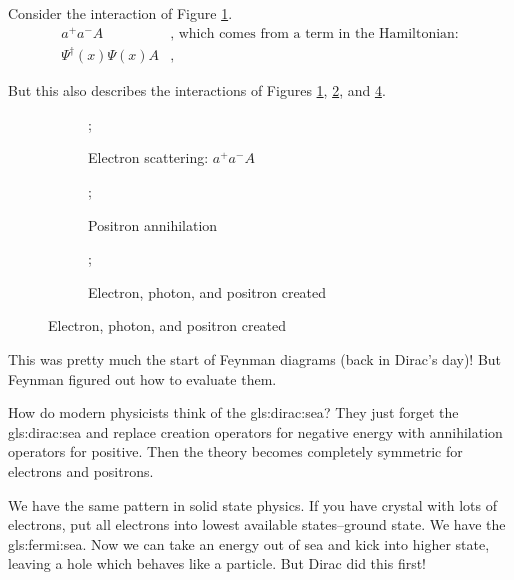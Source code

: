 \documentclass[]{article}
\begin{document}
Consider the interaction of Figure \ref{fig:electron_scattering_dirac}.
\begin{align*}
	a^+a^-A& \text{, which comes from a term in the Hamiltonian:}\\
	\Psi^\dagger(x)\Psi(x)A&\text{, }
\end{align*}

But this also describes the interactions of  Figures \ref{fig:electron_scattering_dirac}, \ref{fig:positron annihilating_dirac}, and \ref{fig:all3-created}.
\begin{figure}[H]
	\caption{Possible outcomes of $\Psi^\dagger(x)\Psi(x)A$: Feynman diagrams.}
	\begin{subfigure}[t]{0.3\textwidth}
		\caption{Electron scattering: $a^+a^-A$}\label{fig:electron_scattering_dirac}
		;
	\end{subfigure}
	\hfill
	\begin{subfigure}[t]{0.3\textwidth}
		\caption{Positron annihilation}\label{fig:positron annihilating_dirac}
		;
	\end{subfigure}
	\hfill
	\begin{subfigure}[t]{0.3\textwidth}
		\caption{Electron, photon, and positron created}\label{fig:all3-created}
		;
	\end{subfigure}
\end{figure}

This was pretty much the start of Feynman diagrams (back in Dirac's day)! But Feynman figured out how to evaluate them.

How do modern physicists think of the \gls{gls:dirac:sea}? They just forget the \gls{gls:dirac:sea} and replace creation operators for negative energy with annihilation operators for positive. Then the theory becomes completely symmetric for electrons and positrons.

We have the same pattern in solid state physics. If you have crystal with lots of electrons, put all electrons into lowest available states--ground state. We have the \gls{gls:fermi:sea}. Now we can take an energy out of sea and kick into higher state, leaving a hole which behaves like a particle. But Dirac did this first!
\end{document}
